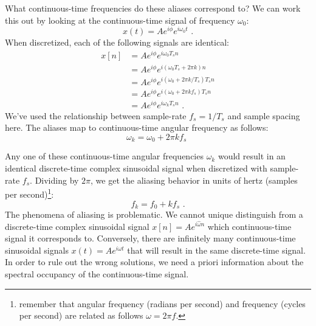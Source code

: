 What continuous-time frequencies do these aliases correspond to? We
can work this out by looking at the continuous-time signal of
frequency $\omega_0$:
\begin{equation}
  x(t) = A e^{i\phi} e^{i\omega_0 t}\,\,.
\end{equation}
When discretized, each of the following signals are identical:
\begin{align}
  x[n] &=A e^{i\phi} e^{i \omega_0 T_s n }\\
 &= A e^{i\phi} e^{i(\omega_0 T_s + 2\pi k) n }\\
  &= A e^{i\phi} e^{i(\omega_0 + 2\pi k/T_s) T_s n }  \\
    &= A e^{i\phi} e^{i(\omega_0 + 2\pi k f_s) T_s n }  \\
    &= A e^{i\phi} e^{i \omega_k T_s n } \,\,.
\end{align}
We've used the relationship between sample-rate $f_s=1/T_s$ and sample
spacing here. The aliases map to continuous-time angular frequency as
follows:
\begin{equation}
  \boxed{
    \omega_k = \omega_0 + 2\pi k f_s
    }\,\,
\end{equation}

Any one of these continuous-time angular frequencies $\omega_k$ would
result in an identical discrete-time complex sinusoidal signal when
discretized with sample-rate $f_s$. Dividing by
$2\pi$, we get the aliasing behavior in units of hertz (samples per
second)\footnote{remember that angular frequency (radians per second)
  and frequency (cycles per second) are related as follows $\omega = 2\pi
  f$.}:
\begin{equation}
  \boxed{
    f_k = f_0 + k f_s
    }\,\,.
\end{equation}
The phenomena of aliasing is problematic. We cannot unique distinguish
from a discrete-time complex sinusoidal signal $x[n]=Ae^{i\hat{\omega}n}$ 
which continuous-time signal it corresponds to. Conversely,
there are infinitely many continuous-time sinusoidal signals
$x(t)=Ae^{i\omega t}$ that will result in the same discrete-time
signal. In order to rule out the wrong solutions, we need a priori
information about the spectral occupancy of the continuous-time
signal.


